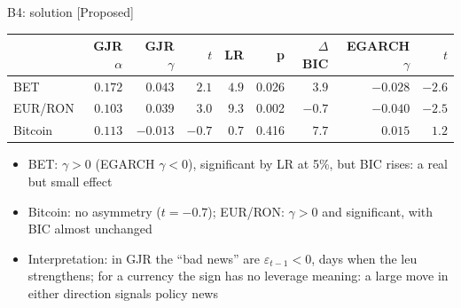 \ifsolutions
\begin{frame}{B4: solution [Proposed]}
\itemsize{\footnotesize}
\begin{center}
\footnotesize
\begin{tabular}{lrrrrrrrr}
\toprule
& GJR $\alpha$ & GJR $\gamma$ & $t$ & LR & p & $\Delta$BIC & EGARCH $\gamma$ & $t$ \\
\midrule
BET & $0.172$ & $0.043$ & ${2.1}$ & $4.9$ & 0.026 & ${3.9}$ & ${-0.028}$ & ${-2.6}$ \\
EUR/RON & $0.103$ & $0.039$ & ${3.0}$ & $9.3$ & 0.002 & ${-0.7}$ & ${-0.040}$ & ${-2.5}$ \\
Bitcoin & $0.113$ & $-0.013$ & ${-0.7}$ & $0.7$ & 0.416 & ${7.7}$ & ${0.015}$ & ${1.2}$ \\
\bottomrule
\end{tabular}
\end{center}
\begin{itemize}
    \item BET: $\gamma > 0$ (EGARCH $\gamma < 0$), significant by LR at 5\%, but BIC rises: a real but small effect
    \item Bitcoin: no asymmetry ($t = -0.7$); EUR/RON: $\gamma > 0$ and significant, with BIC almost unchanged
    \item Interpretation: in GJR the ``bad news'' are $\varepsilon_{t-1} < 0$, days when the leu strengthens; for a currency the sign has no leverage meaning: a large move in either direction signals policy news
\end{itemize}
\end{frame}
\fi

